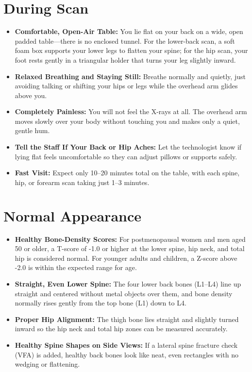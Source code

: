 \section{During Scan}
\begin{itemize}
\item \textbf{Comfortable, Open-Air Table:} You lie flat on your back on a wide, open padded table---there is no enclosed tunnel. For the lower-back scan, a soft foam box supports your lower legs to flatten your spine; for the hip scan, your foot rests gently in a triangular holder that turns your leg slightly inward.
\item \textbf{Relaxed Breathing and Staying Still:} Breathe normally and quietly, just avoiding talking or shifting your hips or legs while the overhead arm glides above you.
\item \textbf{Completely Painless:} You will not feel the X-rays at all. The overhead arm moves slowly over your body without touching you and makes only a quiet, gentle hum.
\item \textbf{Tell the Staff If Your Back or Hip Aches:} Let the technologist know if lying flat feels uncomfortable so they can adjust pillows or supports safely.
\item \textbf{Fast Visit:} Expect only 10--20 minutes total on the table, with each spine, hip, or forearm scan taking just 1--3 minutes.
\end{itemize}

\section{Normal Appearance}
\begin{itemize}
\item \textbf{Healthy Bone-Density Scores:} For postmenopausal women and men aged 50 or older, a T-score of -1.0 or higher at the lower spine, hip neck, and total hip is considered normal. For younger adults and children, a Z-score above -2.0 is within the expected range for age.
\item \textbf{Straight, Even Lower Spine:} The four lower back bones (L1--L4) line up straight and centered without metal objects over them, and bone density normally rises gently from the top bone (L1) down to L4.
\item \textbf{Proper Hip Alignment:} The thigh bone lies straight and slightly turned inward so the hip neck and total hip zones can be measured accurately.
\item \textbf{Healthy Spine Shapes on Side Views:} If a lateral spine fracture check (VFA) is added, healthy back bones look like neat, even rectangles with no wedging or flattening.
\end{itemize}

